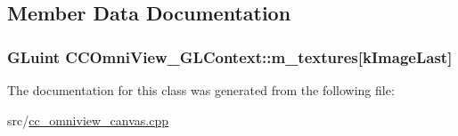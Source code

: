 \subsection{Member Data Documentation}
\hypertarget{a00050_a00cadfd974ac7c904eba18fded443089}{
\subsubsection[{m\-\_\-textures}]{\setlength{\rightskip}{0pt plus 5cm}G\-Luint C\-C\-Omni\-View\-\_\-\-G\-L\-Context\-::m\-\_\-textures\mbox{[}{\bf k\-Image\-Last}\mbox{]}\hspace{0.3cm}{\ttfamily [private]}}}\label{a00050_a00cadfd974ac7c904eba18fded443089}


The documentation for this class was generated from the following file\-:\begin{DoxyCompactItemize}
\item 
src/\hyperlink{a00184}{cc\-\_\-omniview\-\_\-canvas.\-cpp}\end{DoxyCompactItemize}
